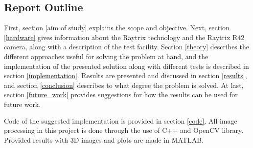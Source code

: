 \subsection{Report Outline} \label{report_outline}

First, section \ref{aim of study} explains the scope and objective. Next, section \ref{hardware} gives information about the Raytrix technology and the Raytrix R42 camera, along with a description of the test facility.
Section \ref{theory} describes the different approaches useful for solving the problem at hand, and the implementation of the presented solution along with different tests is described in section \ref{implementation}.
Results are presented and discussed in section \ref{results}, and section \ref{conclusion} describes to what degree the problem is solved.
At last, section \ref{future_work} provides suggestions for how the results can be used for future work.

Code of the suggested implementation is provided in section \ref{code}.
All image processing in this project is done through the use of C++ and OpenCV library. Provided results with 3D images and plots are made in MATLAB.



